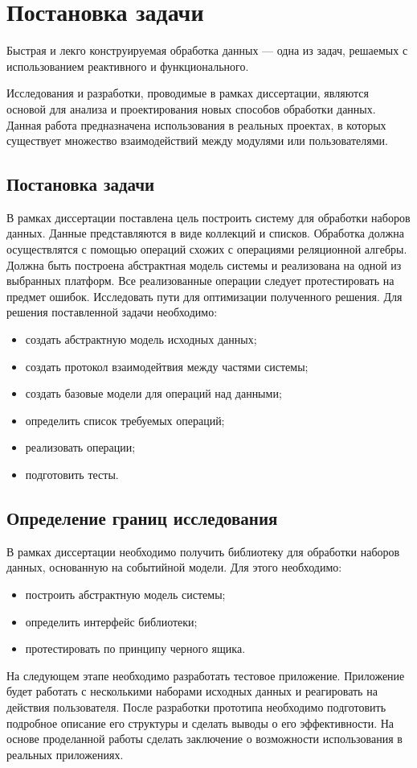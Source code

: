 \chapter{Постановка задачи}
\label{sec:practice:planning}

Быстрая и лекго конструируемая обработка данных --- одна из задач, решаемых с использованием реактивного и функционального.

Исследования и разработки, проводимые в рамках диссертации, являются основой для анализа и проектирования новых способов обработки данных.
Данная работа предназначена использования в реальных проектах, в которых существует множество взаимодействий между модулями или пользователями.

\section{Постановка задачи}
\label{sub:practice:task_planning}

В рамках диссертации поставлена цель построить систему для обработки наборов данных.
Данные представляются в виде коллекций и списков.
Обработка должна осуществлятся с помощью операций схожих с операциями реляционной алгебры.
Должна быть построена абстрактная модель системы и реализована на одной из выбранных платформ.
Все реализованные операции следует протестировать на предмет ошибок.
Исследовать пути для оптимизации полученного решения.
Для решения поставленной задачи необходимо:
\begin{itemize}
  \item создать абстрактную модель исходных данных;
  \item создать протокол взаимодейтвия между частями системы;
  \item создать базовые модели для операций над данными;
  \item	определить список требуемых операций;
  \item	реализовать операции;
  \item	подготовить тесты.
\end{itemize}

\section{Определение границ исследования}
\label{sub:practice:task_milestone}

В рамках диссертации необходимо получить библиотеку для обработки наборов данных, основанную на событийной модели.
Для этого необходимо:
\begin{itemize}
  \item построить абстрактную модель системы;
  \item определить интерфейс библиотеки;
  \item протестировать по принципу черного ящика.
\end{itemize}

На следующем этапе необходимо разработать тестовое приложение.
Приложение будет работать с несколькими наборами исходных данных и реагировать на действия пользователя.
После разработки прототипа необходимо подготовить подробное описание его структуры и сделать выводы о его эффективности.
На основе проделанной работы сделать заключение о возможности использования в реальных приложениях.
